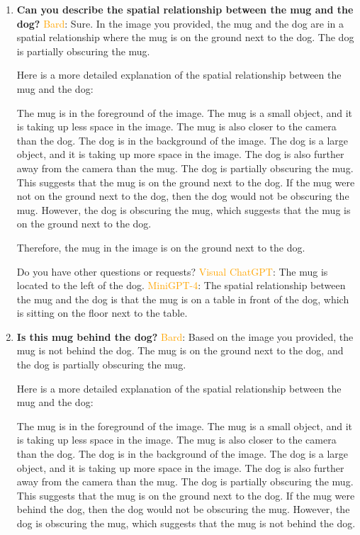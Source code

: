 \begin{enumerate}
    \item \textbf{Can you describe the spatial relationship between the mug and the dog?}
    \subitem \textcolor{orange}{Bard}: 
    Sure. In the image you provided, the mug and the dog are in a spatial relationship where the mug is on the ground next to the dog. The dog is partially obscuring the mug.
    
    Here is a more detailed explanation of the spatial relationship between the mug and the dog:
    
    The mug is in the foreground of the image. The mug is a small object, and it is taking up less space in the image. The mug is also closer to the camera than the dog.
    The dog is in the background of the image. The dog is a large object, and it is taking up more space in the image. The dog is also further away from the camera than the mug.
    The dog is partially obscuring the mug. This suggests that the mug is on the ground next to the dog.
    If the mug were not on the ground next to the dog, then the dog would not be obscuring the mug. However, the dog is obscuring the mug, which suggests that the mug is on the ground next to the dog.
    
    Therefore, the mug in the image is on the ground next to the dog.
    
    Do you have other questions or requests?
    \subitem \textcolor{orange}{Visual ChatGPT}: The mug is located to the left of the dog.
    \subitem \textcolor{orange}{MiniGPT-4}: The spatial relationship between the mug and the dog is that the mug is on a table in front of the dog, which is sitting on the floor next to the table.
    \item \textbf{Is this mug behind the dog?}
    \subitem \textcolor{orange}{Bard}: 
    Based on the image you provided, the mug is not behind the dog. The mug is on the ground next to the dog, and the dog is partially obscuring the mug.
    
    Here is a more detailed explanation of the spatial relationship between the mug and the dog:
    
    The mug is in the foreground of the image. The mug is a small object, and it is taking up less space in the image. The mug is also closer to the camera than the dog.
    The dog is in the background of the image. The dog is a large object, and it is taking up more space in the image. The dog is also further away from the camera than the mug.
    The dog is partially obscuring the mug. This suggests that the mug is on the ground next to the dog.
    If the mug were behind the dog, then the dog would not be obscuring the mug. However, the dog is obscuring the mug, which suggests that the mug is not behind the dog.
    

\end{enumerate}
